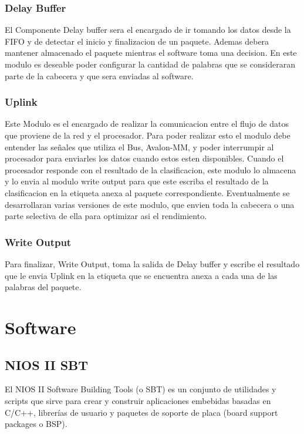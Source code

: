 \subsubsection{Delay Buffer}
El Componente Delay buffer sera el encargado de ir tomando los datos desde la FIFO y de detectar el inicio y finalizacion de un paquete. Ademas debera mantener almacenado el paquete mientras el software toma una decision. En este modulo es deseable poder configurar la cantidad de palabras que se consideraran parte de la cabecera y que sera enviadas al software. 

\subsubsection{Uplink}
Este Modulo es el encargado de realizar la comunicacion entre el flujo de datos que proviene de la red y el procesador. Para poder realizar esto el modulo debe entender las señales que utiliza el Bus, Avalon-MM, y poder interrumpir al procesador para enviarles los datos cuando estos esten disponibles. Cuando el procesador responde con el resultado de la clasificacion, este modulo lo almacena y lo envia al modulo write output para que este escriba el resultado de la clasificacion en la etiqueta anexa al paquete correspondiente.
Eventualmente se desarrollaran varias versiones de este modulo, que envien toda la cabecera o una parte selectiva de ella para optimizar asi el rendimiento.

\subsubsection{Write Output}
Para finalizar, Write Output, toma la salida de Delay buffer y escribe el resultado que le envia Uplink en la etiqueta que se encuentra anexa a cada una de las palabras del paquete.

\section{Software}

\subsection{NIOS II SBT}

El NIOS II Software Building Tools (o SBT) es un conjunto de utilidades y scripts que sirve para crear y construir aplicaciones embebidas basadas en C/C++, librerías de usuario y paquetes de soporte de placa (board support packages o BSP). 

